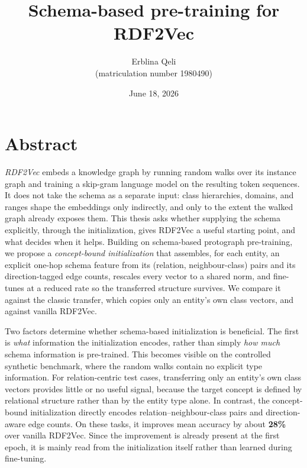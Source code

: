\documentclass[a4paper,oneside,bibliography=totoc]{scrbook}
\begin{document}
\frontmatter \subject{Master Thesis} %
\title{Schema-based pre-training for
RDF2Vec}
\author{Erblina Qeli\\
  (matriculation number 1980490)} \date{June 18, 2026}
\publishers{{\small Submitted to}\\
  Data and Web Science Group\\
  Prof.\ Dr.\ Heiko Paulheim\\
  University of Mannheim\\}
\maketitle

\chapter{Abstract}

\emph{RDF2Vec} embeds a knowledge graph by running random walks over its instance
graph and training a skip-gram language model on the resulting token sequences. It
does not take the schema as a separate input: class hierarchies, domains, and
ranges shape the embeddings only indirectly, and only to the extent the walked
graph already exposes them. This thesis asks whether supplying the schema
explicitly, through the initialization, gives RDF2Vec a useful starting point, and
what decides when it helps. Building on schema-based protograph pre-training, we
propose a \emph{concept-bound initialization} that assembles, for each entity, an
explicit one-hop schema feature from its (relation, neighbour-class) pairs and its
direction-tagged edge counts, rescales every vector to a shared norm, and
fine-tunes at a reduced rate so the transferred structure survives. We compare it
against the classic transfer, which copies only an entity's own class vectors, and
against vanilla RDF2Vec.

Two factors determine whether schema-based initialization is beneficial. 
The first is \emph{what} information the initialization encodes, rather than simply 
\emph{how much} schema information is pre-trained. 
This becomes visible on the controlled synthetic benchmark, where the random walks
 contain no explicit type information. For relation-centric test cases, transferring
  only an entity's own class vectors provides little or no useful signal, because the 
  target concept is defined by relational structure rather than by the entity type 
  alone. In contrast, the concept-bound initialization directly encodes relation--neighbour-class pairs and direction-aware edge counts. On these tasks, it improves mean accuracy by about \textbf{28\%} over vanilla RDF2Vec. Since the improvement is already present at the first epoch, it is mainly read from the initialization itself rather than learned during fine-tuning.
\end{document}
